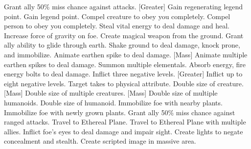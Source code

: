     {Grant ally 50\% miss chance against attacks.}
[Greater]
    {Gain regenerating legend point.}
    {Gain legend point.}
    {Compel creature to obey you completely.}
    {Compel person to obey you completely.}
    {Steal vital energy to deal damage and heal.}
    {Increase force of gravity on foe.}
    {Create magical weapon from the ground.}
    {Grant ally ability to glide through earth.}
    {Shake ground to deal damage, knock prone, and immobilize.}
    {Animate earthen spike to deal damage.}
[Mass]
    {Animate multiple earthen spikes to deal damage.}
    {Summon multiple elementals.}
    {Absorb energy, fire energy bolts to deal damage.}
    {Inflict three negative levels.}
[Greater]
    {Inflict up to eight negative levels.}
    {Target takes  to physical attribute.}
    {Double size of creature.}
[Mass]
    {Double size of multiple creatures.}
[Mass]
    {Double size of multiple humanoids.}
    {Double size of humanoid.}
    {Immobilize foe with nearby plants.}
    {Immobilize foe with newly grown plants.}
    {Grant ally 50\% miss chance against ranged attacks.}
    {Travel to Ethereal Plane.}
    {Travel to Ethereal Plane with multiple allies.}
    {Inflict foe's eyes to deal damage and impair sight.}
    {Create lights to negate concealment and stealth.}
    {Create scripted image in massive area.}

